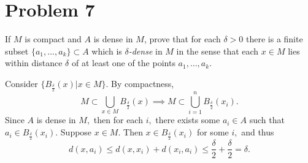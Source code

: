 \documentclass[11pt]{article}
\begin{document}
\section*{Problem 7}
\begin{problem}
     If $M$ is compact and $A$ is dense in $M$, prove that for each $\delta>0$ there is a finite
 subset $\{a_1,\dots,a_k\}\subset A$ which is \textit{$\delta$-dense} in $M$ in the sense that each $x \in M$ lies within distance $\delta$ of at least one of the points $a_1,\dots, a_k.$
\end{problem}
\begin{solution}
    Consider $\{B_\frac{\delta}{2}(x) | x\in M\}.$ By compactness, 
    \[M \subset \bigcup_{x\in M}B_{\frac{\delta}{2}}(x) \implies M \subset \bigcup_{i = 1}^n B_{\frac{\delta}{2}}(x_i).\] Since $A$ is dense in $M,$ then for each $i,$ there exists some $a_i\in A$ such that $a_i \in B_\frac{\delta}{2}(x_i).$ Suppose $x\in M.$ Then $x \in B_{\frac{\delta}{2}}(x_i)$ for some $i,$ and thus 
    \[d(x,a_i) \leq d(x, x_i) + d(x_i, a_i)\leq \frac{\delta}{2} + \frac{\delta}{2} = \delta.\]
\end{solution}

\newpage
\end{document}

